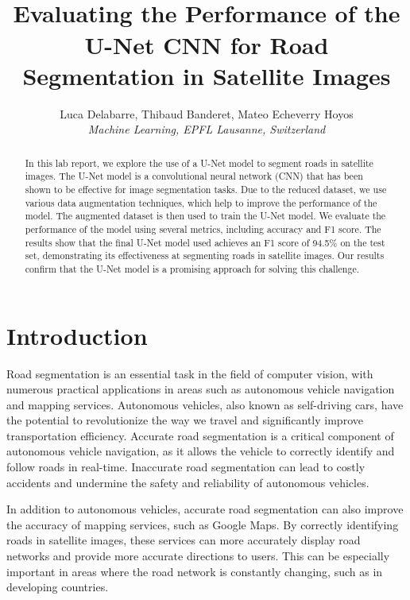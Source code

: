 \documentclass[10pt,conference,compsocconf]{IEEEtran}
\begin{document}
\title{\Large{\\
\textbf{Evaluating the Performance of the U-Net CNN for Road Segmentation in Satellite Images}}}


\author{Luca Delabarre, Thibaud Banderet, Mateo Echeverry Hoyos\\
\textit{Machine Learning, EPFL Lausanne, Switzerland}}

\maketitle
\begin{abstract}
In this lab report, we explore the use of a U-Net model to segment roads in satellite images. The U-Net model is a convolutional neural network (CNN) that has been shown to be effective for image segmentation tasks. Due to the reduced dataset, we use various data augmentation techniques, which help to improve the performance of the model. The augmented dataset is then used to train the U-Net model. We evaluate the performance of the model using several metrics, including accuracy and F1 score. The results show that the final U-Net model used achieves an F1 score of 94.5\% on the test set, demonstrating its effectiveness at segmenting roads in satellite images. Our results confirm that the U-Net model is a promising approach for solving this challenge.
\end{abstract}
\vspace{-0.1in}
\section{Introduction}
Road segmentation is an essential task in the field of computer vision, with numerous practical applications in areas such as autonomous vehicle navigation and mapping services. Autonomous vehicles, also known as self-driving cars, have the potential to revolutionize the way we travel and significantly improve transportation efficiency. Accurate road segmentation is a critical component of autonomous vehicle navigation, as it allows the vehicle to correctly identify and follow roads in real-time. Inaccurate road segmentation can lead to costly accidents and undermine the safety and reliability of autonomous vehicles.

In addition to autonomous vehicles, accurate road segmentation can also improve the accuracy of mapping services, such as Google Maps. By correctly identifying roads in satellite images, these services can more accurately display road networks and provide more accurate directions to users. This can be especially important in areas where the road network is constantly changing, such as in developing countries.
\end{document}
